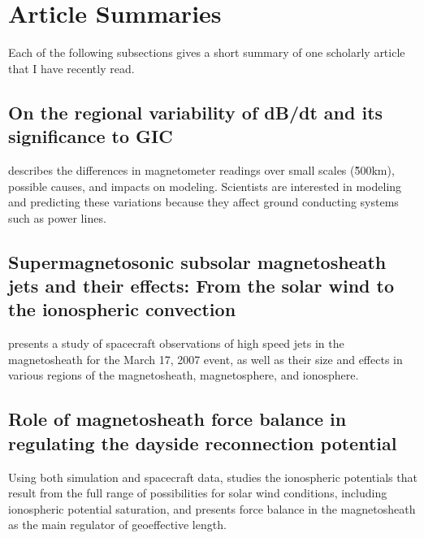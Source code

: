\documentclass[12pt, letterpaper]{article}
\begin{document}
\section{Article Summaries}


Each of the following subsections gives a short summary of one scholarly article that I have recently read. 


\subsection{On the regional variability of dB/dt and its significance to GIC}

\citet[]{Dimmock2020} describes the differences in magnetometer readings over small scales (\~500km), possible causes, and impacts on modeling. Scientists are interested in modeling and predicting these variations because they affect ground conducting systems such as power lines.


\subsection{Supermagnetosonic subsolar magnetosheath jets and their effects: From the solar wind to the ionospheric convection}

\citet[]{Hietala2012} presents a study of spacecraft observations of high speed jets in the magnetosheath for the March 17, 2007 event, as well as their size and effects in various regions of the magnetosheath, magnetosphere, and ionosphere.


\subsection{Role of magnetosheath force balance in regulating the dayside reconnection potential}

Using both simulation and spacecraft data, \citet[]{Lopez2010} studies the ionospheric potentials that result from the full range of possibilities for solar wind conditions, including ionospheric potential saturation, and presents force balance in the magnetosheath as the main regulator of geoeffective length. 


\end{document}
